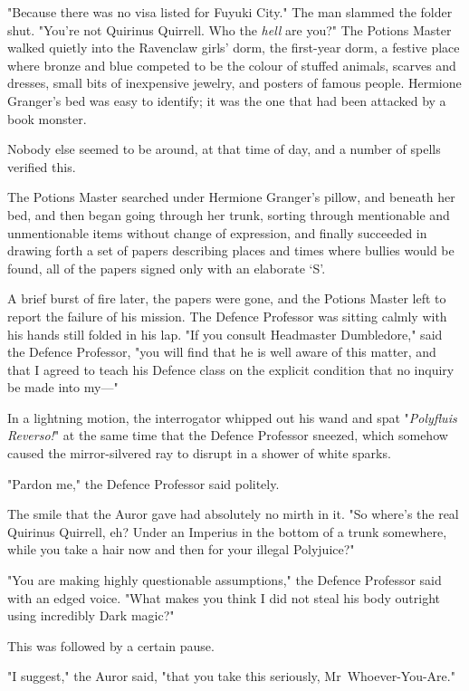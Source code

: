 "Because there was no visa listed for Fuyuki City." The man slammed the folder
shut. "You're not Quirinus Quirrell. Who the \emph{hell} are you?"
\later
The Potions Master walked quietly into the Ravenclaw girls' dorm, the
first-year dorm, a festive place where bronze and blue competed to be the
colour of stuffed animals, scarves and dresses, small bits of inexpensive
jewelry, and posters of famous people. Hermione Granger's bed was easy to
identify; it was the one that had been attacked by a book monster.

Nobody else seemed to be around, at that time of day, and a number of spells
verified this.

The Potions Master searched under Hermione Granger's pillow, and beneath her
bed, and then began going through her trunk, sorting through mentionable and
unmentionable items without change of expression, and finally succeeded in
drawing forth a set of papers describing places and times where bullies would
be found, all of the papers signed only with an elaborate `S'.

A brief burst of fire later, the papers were gone, and the Potions Master left
to report the failure of his mission.
\later
The Defence Professor was sitting calmly with his hands still folded in his
lap. "If you consult Headmaster Dumbledore," said the Defence Professor, "you
will find that he is well aware of this matter, and that I agreed to teach his
Defence class on the explicit condition that no inquiry be made into my—"

In a lightning motion, the interrogator whipped out his wand and spat
"\emph{Polyfluis Reverso!}" at the same time that the Defence Professor
sneezed, which somehow caused the mirror-silvered ray to disrupt in a shower of
white sparks.

"Pardon me," the Defence Professor said politely.

The smile that the Auror gave had absolutely no mirth in it. "So where's the
real Quirinus Quirrell, eh? Under an Imperius in the bottom of a trunk
somewhere, while you take a hair now and then for your illegal Polyjuice?"

"You are making highly questionable assumptions," the Defence Professor said
with an edged voice. "What makes you think I did not steal his body outright
using incredibly Dark magic?"

This was followed by a certain pause.

"I suggest," the Auror said, "that you take this seriously,
Mr~Whoever-You-Are."

